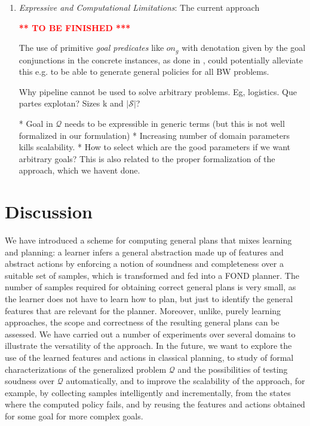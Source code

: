 \documentclass[letterpaper]{article} %
\newcommand{\Omit}[1]{}
\newcommand{\abs}[1]{\ensuremath{\left\vert{#1}\right\vert}}
\newcommand{\alert}[1]{\textcolor{red}{\bf #1}}
\newcommand{\Q}{\mathcal{Q}}
\begin{document}
\begin{enumerate}
\item
\emph{Expressive and Computational Limitations}:
The current approach

\alert{*** TO BE FINISHED ***}

The use of primitive \emph{goal predicates} like $on_g$ with denotation
given by the goal conjunctions in the concrete instances, as done in
\cite{martin-geffner:generalized}, could potentially alleviate this
e.g. to be able to generate general policies for all BW problems.


Why pipeline cannot be used to solve arbitrary problems. Eg, logistics.
Que partes explotan? Sizes k and $\abs{\mathcal{S}}$?

* Goal in $\Q$ needs to be expressible in generic terms (but this is not well formalized in our formulation)
* Increasing number of domain parameters kills scalability.
* How to select which are the good parameters if we want arbitrary goals? This is also related to the proper formalization
  of the approach, which we havent done.



\end{enumerate}


\section{Discussion}

We have introduced a scheme for computing general plans that mixes
learning and planning: a learner infers a general abstraction made
up of features and abstract actions by enforcing a notion of soundness
and completeness over a suitable set of samples, which is transformed
and fed into a FOND planner.
The number of samples required for obtaining correct general plans is
very small, as the learner does not have to learn how to plan, but
just to identify the general features that are relevant for the planner.
Moreover, unlike, purely learning approaches, the scope and correctness
of the resulting general plans can be assessed.
We have carried out a number of experiments over several domains to 
illustrate the versatility of the approach. In the future, we want to
explore the use of the learned features and actions in classical
planning, to study of formal characterizations of the generalized
problem $\Q$ and the possibilities of testing soudness over $\Q$
automatically, and to improve the scalability of the approach,
for example, by collecting samples intelligently and incrementally,
from the states where the computed policy fails, and by reusing the
features and actions obtained for some goal for more complex goals.

\Omit{
** discussion  of experiments; things we do well and not, scope, lessons. limitations (expressive? scalability?)
** briefly related work, expanding paragraph in intro.
** summary and cconlusions
}



\end{document}
